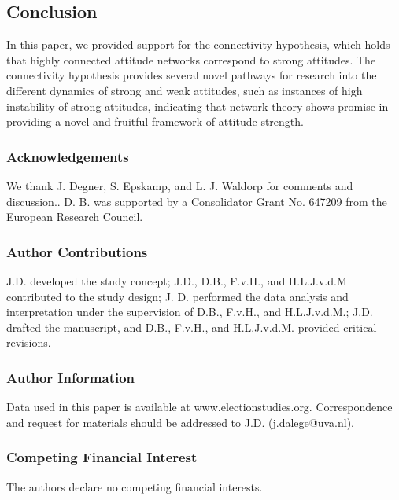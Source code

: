 \documentclass[10pt]{article}
\begin{document}
\begin{multicols}{2}
\subsection*{Conclusion}
In this paper, we provided support for the connectivity hypothesis, which holds that highly connected attitude networks correspond to strong attitudes. The connectivity hypothesis provides several novel pathways for research into the different dynamics of strong and weak attitudes, such as instances of high instability of strong attitudes, indicating that network theory shows promise in providing a novel and fruitful framework of attitude strength.  








 


\subsubsection*{Acknowledgements} 
We thank J. Degner, S. Epskamp, and L. J. Waldorp for comments and discussion.. D. B. was supported by a Consolidator Grant No. 647209 from the European Research Council.
\subsubsection*{Author Contributions} 
J.D. developed the study concept; J.D., D.B., F.v.H., and H.L.J.v.d.M contributed to the study design; J. D. performed the data analysis and interpretation under the supervision of D.B., F.v.H., and H.L.J.v.d.M.; J.D. drafted the manuscript, and D.B., F.v.H., and H.L.J.v.d.M. provided critical revisions.\subsubsection*{Author Information} 
Data used in this paper is available at www.electionstudies.org. Correspondence and request for materials should be addressed to J.D. (j.dalege@uva.nl).
\subsubsection*{Competing Financial Interest} 
The authors declare no competing financial interests.


\end{multicols}
\end{document}
